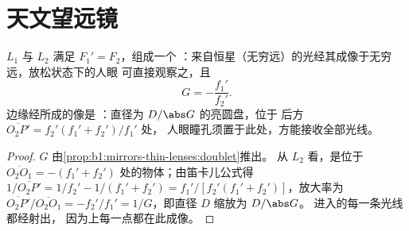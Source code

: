 \section{天文望远镜}

\begin{proposition}[折射式望远镜]\label{prop:b1:optical-instruments:telescope}
 $L_1$ 与 $L_2$ 满足 $F_1' = F_2$，组成一个
：来自恒星（无穷远）的光经其成像于无穷远，放松状态下的人眼
可直接观察之，且
\[
G = -\frac{f_1'}{f_2'} .
\]
边缘经所成的像是
\emph{}：直径为 $D/\abs G$ 的亮圆盘，位于
后方 $\overline{O_2P'} = f_2'(f_1' + f_2')/f_1'$ 处，
人眼瞳孔须置于此处，方能接收全部光线。
\end{proposition}

\begin{proof}
$G$ 由\cref{prop:b1:mirrors-thin-lenses:doublet}推出。
从 $L_2$ 看，是位于 $\overline{O_2O_1} = -(f_1'
+ f_2')$ 处的物体；由笛卡儿公式得 $1/\overline{O_2P'} = 1/f_2' - 1/(f_1' + f_2')
= f_1'/[f_2'(f_1' + f_2')]$，放大率为 $\overline{O_2P'}/
\overline{O_2O_1} = -f_2'/f_1' = 1/G$，即直径 $D$ 缩放为 $D/\abs G$。
进入的每一条光线都经射出，
因为上每一点都在此成像。
\end{proof}

